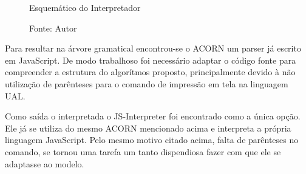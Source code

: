 \begin{figure}[h]
  \caption{Esquemático do Interpretador}\label{fig:flux}
  \centering
  \setlength{\fboxsep}{0pt}%
\setlength{\fboxrule}{1pt}%
  \caption*{\footnotesize Fonte: Autor}
\end{figure}

Para resultar na árvore gramatical encontrou-se o ACORN\nocite{acorn} um parser já escrito em JavaScript. De modo trabalhoso foi necessário adaptar o código fonte para compreender a estrutura do algorítmos proposto, principalmente devido à não utilização de parênteses para o comando de impressão em tela na linguagem UAL.

Como saída o interpretada o JS-Interpreter\nocite{jsinterpreter} foi encontrado como a única opção. Ele já se utiliza do mesmo ACORN mencionado acima e interpreta a própria linguagem JavaScript. Pelo mesmo motivo citado acima, falta de parênteses no comando, se tornou uma tarefa um tanto dispendiosa fazer com que ele se adaptasse ao modelo.


